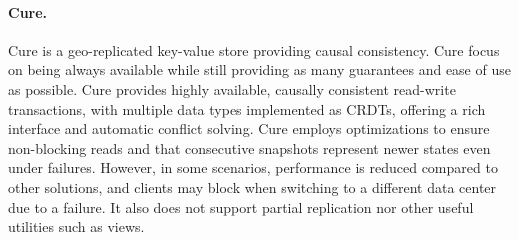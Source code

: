 %

\paragraph{Cure.} Cure \cite{cure} is a geo-replicated key-value store providing causal consistency.
Cure focus on being always available while still providing as many guarantees and ease of use as possible.
Cure provides highly available, causally consistent read-write transactions, with multiple data types implemented as CRDTs, offering a rich interface and automatic conflict solving.
Cure employs optimizations to ensure non-blocking reads and that consecutive snapshots represent newer states even under failures.
However, in some scenarios, performance is reduced compared to other solutions, and clients may block when switching to a different data center due to a failure.
It also does not support partial replication nor other useful utilities such as views.


